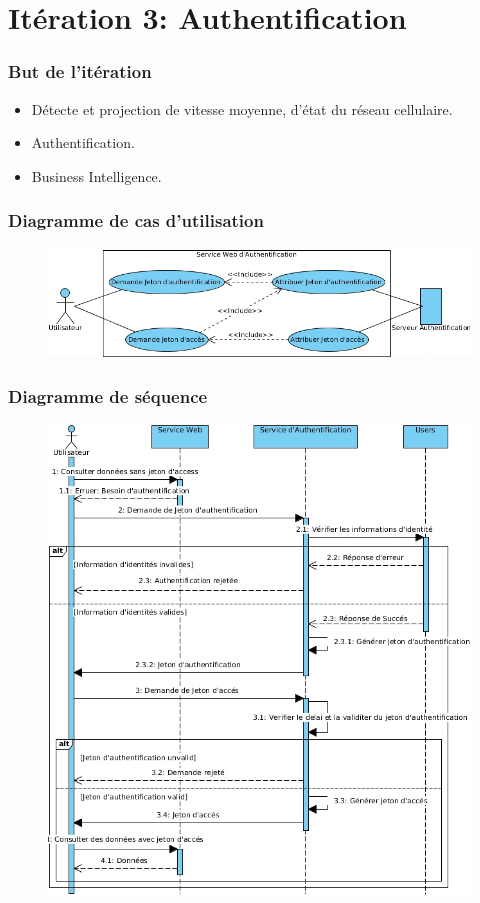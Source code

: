 \documentclass{beamer}
\begin{document}
\section{Itération 3: Authentification}

\begin{frame}
    \frametitle{But de l'itération}
    \begin{itemize}
        \item<1-> Détecte et projection de vitesse moyenne, d'état du réseau cellulaire.
        \item<2-> Authentification.
        \item<3-> Business Intelligence.
    \end{itemize}
\end{frame}

\begin{frame}
    \frametitle{Diagramme de cas d'utilisation}
    \begin{figure}
        \includegraphics[width=\textwidth]{./diagrams/sprint3-webservices-oauth-usecase}
    \end{figure}
\end{frame}

\begin{frame}
    \frametitle{Diagramme de séquence}
    \begin{figure}
        \includegraphics[width=.65\textwidth]{./diagrams/sprint3-webservices-oauth-sequence}
    \end{figure}
\end{frame}
\end{document}
